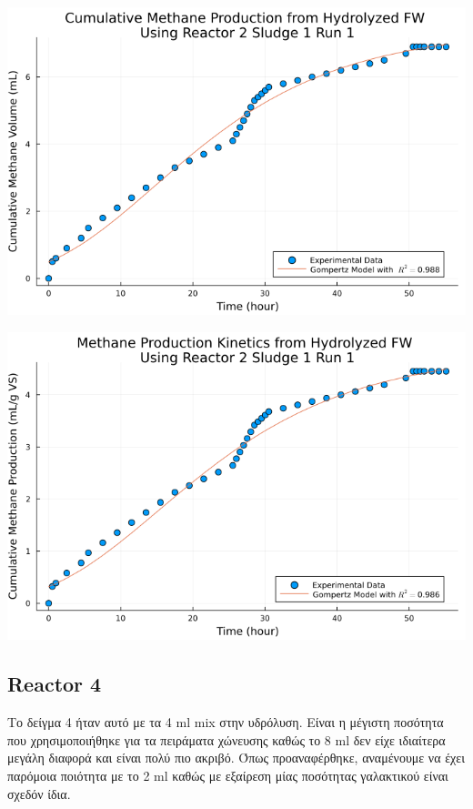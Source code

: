 \documentclass[11pt]{article}
\begin{document}
\begin{enumerate}
\begin{center}
\includegraphics[width=.9\linewidth]{../plots/BMPs/Hydrolyzed FW/methane_kinetics_hydrolysate_2_s1_r1_hour.png}
\end{center}

\begin{center}
\includegraphics[width=.9\linewidth]{../plots/BMPs/Hydrolyzed FW/specific_methane_kinetics_hydrolysate_2_s1_r1_hour.png}
\end{center}
\end{enumerate}

\subsection{Reactor 4}
\label{sec:org527e624}
Το δείγμα 4 ήταν αυτό με τα 4 ml mix στην υδρόλυση. Είναι η μέγιστη ποσότητα που χρησιμοποιήθηκε για τα πειράματα χώνευσης καθώς το 8 ml δεν είχε ιδιαίτερα μεγάλη διαφορά και είναι πολύ πιο ακριβό. Όπως προαναφέρθηκε, αναμένουμε να έχει παρόμοια ποιότητα με το 2 ml καθώς με εξαίρεση μίας ποσότητας γαλακτικού είναι σχεδόν ίδια.
\end{document}
